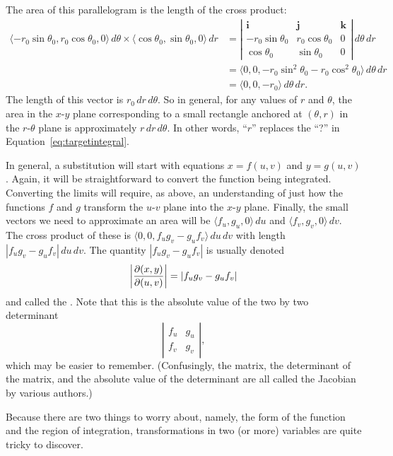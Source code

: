 The area of this parallelogram is the length of the cross product:
\begin{align*}
\langle -r_0\sin\theta_0, r_0\cos\theta_0, 0\rangle\,d\theta\times\langle\cos\theta_0, \sin\theta_0, 0\rangle\,dr
&= \left|\begin{matrix}	\mathbf{i}			&	\mathbf{j}		&	\mathbf{k}	\\
						-r_0\sin\theta_0	&	r_0\cos\theta_0	&	0			\\
						\cos\theta_0		&	\sin\theta_0	&	0
		 \end{matrix}\right|\,d\theta\,dr	\\
&=\langle 0,0,-r_0\sin^2\theta_0-r_0\cos^2\theta_0\rangle\,d\theta\,dr	\\
&=\langle 0,0,-r_0\rangle\,d\theta\,dr.
\end{align*}
The length of this vector is $r_0\,dr\,d\theta$. So in general, for
any values of $r$ and $\theta$, the area in the $x$-$y$ plane
corresponding to a small rectangle anchored at $(\theta,r)$ in the
$r$-$\theta$ plane is approximately $r\,dr\,d\theta$. In other words, ``$r$''
replaces the ``?'' in Equation~\ref{eq:targetintegral}.

In general, a substitution will start with equations $x=f(u,v)$ and
$y=g(u,v)$. Again, it will be straightforward to convert the function
being integrated. Converting the limits will require, as above, an
understanding of just how the functions $f$ and $g$ transform the
$u$-$v$ plane into the $x$-$y$ plane. Finally, the small vectors we
need to approximate an area will be
$\langle f_u,g_u,0\rangle\,du$ and $\langle f_v,g_v,0\rangle\,dv$.
The cross product of these is $\langle
0,0,f_ug_v-g_uf_v\rangle\,du\,dv$ with length 
$|f_ug_v-g_uf_v|\,du\,dv$. The quantity $|f_ug_v-g_uf_v|$ is usually
denoted
$$\left|{\partial(x,y)\over\partial(u,v)}\right|=|f_ug_v-g_uf_v|$$
and called the .
Note that this is the absolute value of the two by two determinant
\[\left|\begin{matrix}	f_u	&	g_u	\\
						f_v	&	g_v
		\end{matrix}\right|,\]
which may be easier to remember. (Confusingly, the matrix, the
determinant of the matrix, and the absolute value of the determinant
are all called the Jacobian by various authors.)

Because there are two things to worry about, namely, the form of the
function and the region of integration, transformations in two (or
more) variables are quite tricky to discover.

